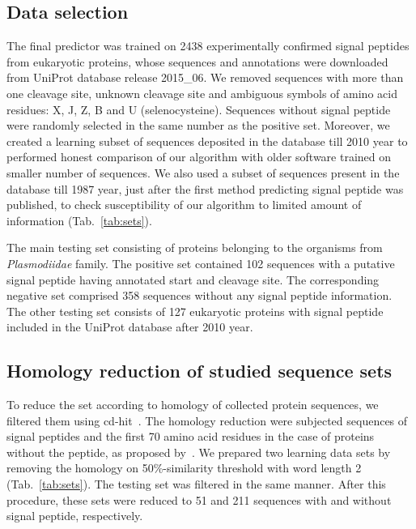 \documentclass[10pt,letterpaper]{article}
\begin{document}
\subsection*{Data selection}

The final predictor was trained on 2438 experimentally confirmed signal peptides from eukaryotic proteins, whose sequences and annotations were downloaded from UniProt database release 2015\_06. We removed sequences with more than one cleavage site, unknown cleavage site and ambiguous symbols of amino acid residues: X, J, Z, B and U (selenocysteine). Sequences without signal peptide were randomly selected in the same number as the positive set. Moreover, we created a learning subset of sequences deposited in the database till 2010 year to performed honest comparison of our algorithm with older software trained on smaller number of sequences. We also used a subset of sequences present in the database till 1987 year, just after the first method predicting signal peptide was published, to check susceptibility of our algorithm to limited amount of information (Tab.~\ref{tab:sets}).

The main testing set consisting of proteins belonging to the organisms from \textit{Plasmodiidae} family. The positive set contained 102 sequences with a putative signal peptide having annotated start and cleavage site. The corresponding negative set comprised 358 sequences without any signal peptide information. The other testing set consists of 127 eukaryotic proteins with signal peptide included in the UniProt database after 2010 year. 

 
\subsection*{Homology reduction of studied sequence sets}

To reduce the set according to homology of collected protein sequences, we filtered them using cd-hit~\cite{2012fucdhit}. The homology reduction were subjected sequences of signal peptides and the first 70 amino acid residues in the case of proteins without the peptide, as proposed by~\cite{1997nielsenidentification}. We prepared two learning data sets by removing the homology on 50\%-similarity threshold with word length 2 (Tab.~\ref{tab:sets}). The testing set was filtered in the same manner. After this procedure, these sets were reduced to 51 and 211 sequences with and without signal peptide, respectively.
\end{document}
